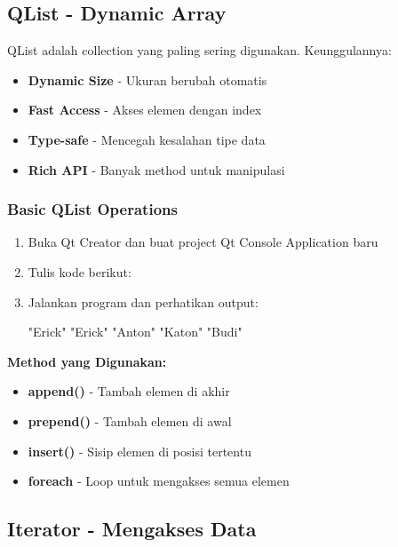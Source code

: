 \subsection{QList - Dynamic Array}

QList adalah collection yang paling sering digunakan. Keunggulannya:

\begin{itemize}
\item \textbf{Dynamic Size} - Ukuran berubah otomatis
\item \textbf{Fast Access} - Akses elemen dengan index
\item \textbf{Type-safe} - Mencegah kesalahan tipe data
\item \textbf{Rich API} - Banyak method untuk manipulasi
\end{itemize}

\subsubsection{Basic QList Operations}

\begin{enumerate}
\item Buka Qt Creator dan buat project Qt Console Application baru
\item Tulis kode berikut:



\item Jalankan program dan perhatikan output:

\begin{lcverbatim}
"Erick"
"Erick"
"Anton"
"Katon"
"Budi"
\end{lcverbatim}
\end{enumerate}

\textbf{Method yang Digunakan:}
\begin{itemize}
\item \textbf{append()} - Tambah elemen di akhir
\item \textbf{prepend()} - Tambah elemen di awal
\item \textbf{insert()} - Sisip elemen di posisi tertentu
\item \textbf{foreach} - Loop untuk mengakses semua elemen
\end{itemize}

\subsection{Iterator - Mengakses Data}


